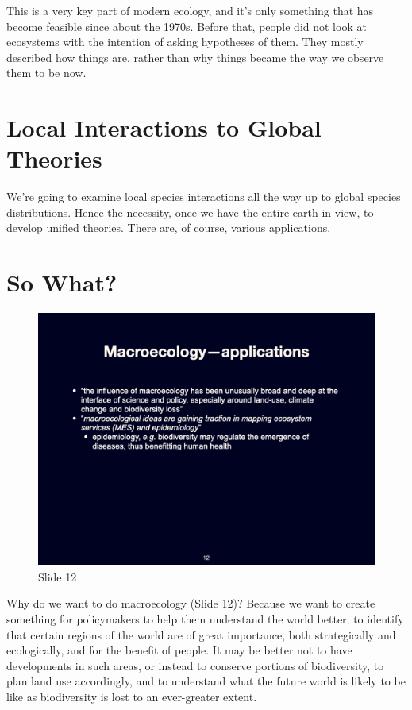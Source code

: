 \documentclass[
  11pt,
]{book}
\begin{document}
This is a very key part of modern ecology, and it's only something that
has become feasible since about the 1970s. Before that, people did not
look at ecosystems with the intention of asking hypotheses of them. They
mostly described how things are, rather than why things became the way
we observe them to be now.

\section{Local Interactions to Global
Theories}\label{local-interactions-to-global-theories}

We're going to examine local species interactions all the way up to
global species distributions. Hence the necessity, once we have the
entire earth in view, to develop unified theories. There are, of course,
various applications.

\section{So What?}\label{so-what}

\begin{figure}[ht]
\centering
\includegraphics[width=0.8\linewidth]{../images/BDC334/BDC334-012.jpeg}
\caption*{Slide 12}
\end{figure}

Why do we want to do macroecology (Slide 12)? Because we want to create
something for policymakers to help them understand the world better; to
identify that certain regions of the world are of great importance, both
strategically and ecologically, and for the benefit of people. It may be
better not to have developments in such areas, or instead to conserve
portions of biodiversity, to plan land use accordingly, and to
understand what the future world is likely to be like as biodiversity is
lost to an ever-greater extent.
\end{document}
